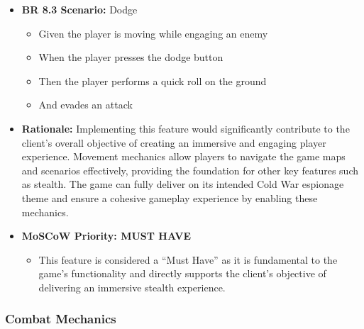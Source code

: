 \documentclass[11pt, a4paper]{article}
\begin{document}
\begin{itemize}
    \item \textbf{BR 8.3 Scenario:} Dodge

          \begin{itemize}
              \item Given the player is moving while engaging an enemy
              \item When the player presses the dodge button
              \item Then the player performs a quick roll on the ground
              \item And evades an attack
          \end{itemize}

    \item \textbf{Rationale:} Implementing this feature would significantly contribute to the client’s overall objective of creating an immersive and engaging player experience. Movement mechanics allow players to navigate the game maps and scenarios effectively, providing the foundation for other key features such as stealth. The game can fully deliver on its intended Cold War espionage theme and ensure a cohesive gameplay experience by enabling these mechanics.

    \item \textbf{MoSCoW Priority: MUST HAVE}

          \begin{itemize}
              \item This feature is considered a “Must Have” as it is fundamental to the game’s functionality and directly supports the client’s objective of delivering an immersive stealth experience.
          \end{itemize}
\end{itemize}

\newpage

\subsubsection{Combat Mechanics}
\end{document}
